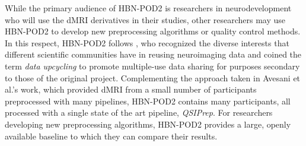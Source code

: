 \documentclass[fleqn,10pt,inline]{wlscirep}
\begin{document}
While the primary audience of HBN-POD2 is researchers in neurodevelopment who
will use the dMRI derivatives in their studies, other researchers may use
HBN-POD2 to develop new preprocessing algorithms or quality control methods. In
this respect, HBN-POD2 follows \cite{avesani2019-ey}, who
recognized the diverse interests that different scientific communities have in
reusing neuroimaging data and coined the term \emph{data upcycling} to promote
multiple-use data sharing for purposes secondary to those of the original
project. Complementing the approach taken in Avesani et al.'s work, which
provided dMRI from a small number of participants preprocessed with many pipelines,
HBN-POD2 contains many participants, all processed with a single state of the art
pipeline, \emph{QSIPrep}. For researchers developing new preprocessing
algorithms, HBN-POD2 provides a large, openly available baseline to which they
can compare their results.
\end{document}

